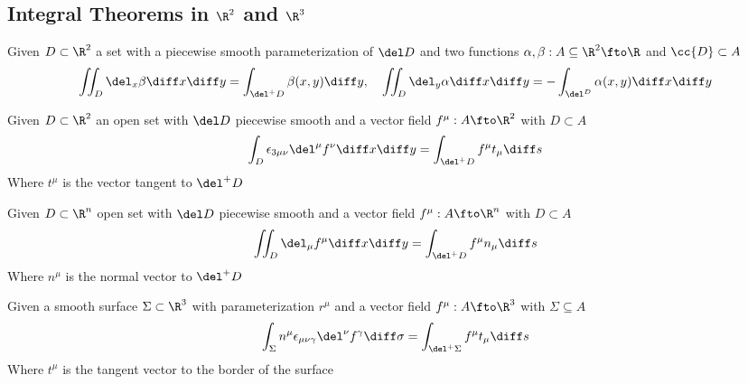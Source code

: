 \documentclass[../mmf.tex]{subfiles}
\begin{document}
\subsection{Integral Theorems in $\R^2$ and $\R^3$}
\begin{thm}
	Given $D\subset\R^2$ a set with a piecewise smooth parameterization of $\del D$ and two functions $\alpha,\beta:A\subseteq\R^2\fto\R$ and $\cc{D}\subset A$
	\begin{equation}
		\iint_{D}^{}\del_x\beta\diff x\diff y=\int_{\del^+D}^{}\beta(x,y)\diff y,\quad\iint_D\del_y\alpha\diff x\diff y=-\int_{\del^D}\alpha(x,y)\diff x\diff y
		\label{eq:gaussgreen1}
	\end{equation}
\end{thm}
\begin{thm}[Stokes]
	Given $D\subset\R^2$ an open set with $\del D$ piecewise smooth and a vector field $f^\mu:A\fto\R^2$ with $D\subset A$
	\begin{equation}
		\int_{D}^{}\epsilon_{3\mu\nu}\del^\mu f^\nu\diff x\diff y=\int_{\del^+D}f^\mu t_\mu\diff s
		\label{eq:stokes}
	\end{equation}
	Where $t^\mu$ is the vector tangent to $\del^+D$
\end{thm}
\begin{thm}[Gauss 1]
	Given $D\subset\R^n$ open set with $\del D$ piecewise smooth and a vector field $f^\mu:A\fto\R^n$ with $D\subset A$
	\begin{equation}
		\iint_D\del_\mu f^\mu\diff x\diff y=\int_{\del^+D}f^\mu n_\mu\diff s
		\label{eq:gaussthm}
	\end{equation}
	Where $n^\mu$ is the normal vector to $\del^+D$
\end{thm}
\begin{thm}
	Given a smooth surface $\Sigma\subset\R^3$ with parameterization $r^\mu$ and a vector field $f^\mu:A\fto\R^3$ with $\Sigma\subseteq A$
	\begin{equation}
		\int_\Sigma n^\mu\epsilon_{\mu\nu\gamma}\del^\nu f^\gamma\diff\sigma=\int_{\del^+\Sigma}f^\mu t_\mu\diff s
		\label{eq:stokessurf}
	\end{equation}
	Where $t^\mu$ is the tangent vector to the border of the surface
\end{thm}
\end{document}
